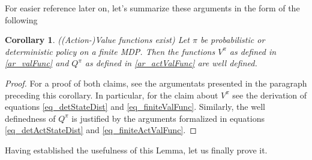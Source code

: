 \documentclass[11pt]{article} %
\newtheorem{cor}{Corollary}
\begin{document}
For easier reference later on, let's summarize these arguments in the form of the following 

\begin{cor}{((Action-)Value functions exist)}
	Let $\pi$ be probabilistic or deterministic policy on a finite MDP. Then the functions $V^{\pi}$ as defined in \ref{ar_valFunc} and $Q^{\pi}$ as defined in \ref{ar_actValFunc} are well defined.
\end{cor}

\begin{proof}
	For a proof of both claims, see the argumentats presented in the paragraph preceding this corollary. In particular, for the claim about $V^{\pi}$ see the derivation of equations \ref{eq_detStateDist} and \ref{eq_finiteValFunc}. Similarly, the well definedness of $Q^{\pi}$ is justified by the arguments formalized in equations \ref{eq_detActStateDist} and \ref{eq_finiteActValFunc}.
\end{proof}

Having established the usefulness of this Lemma, let us finally prove it.
\end{document}
